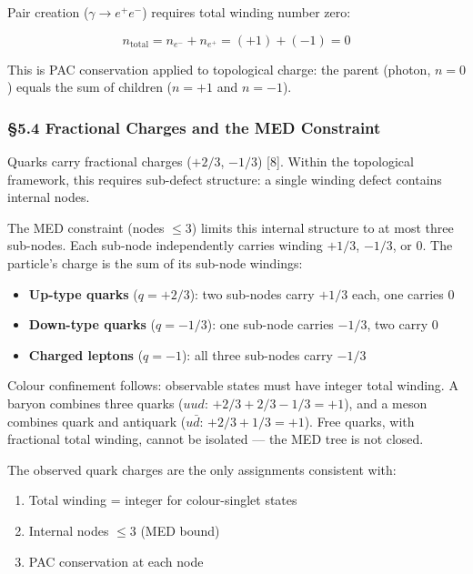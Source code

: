 \documentclass[
  11pt,
  a4paper]{article}
\providecommand{\tightlist}{%
  \setlength{\itemsep}{0pt}\setlength{\parskip}{0pt}}
\begin{document}
Pair creation (\(\gamma \to e^+ e^-\)) requires total winding number
zero:

\[n_\text{total} = n_{e^-} + n_{e^+} = (+1) + (-1) = 0\]

This is PAC conservation applied to topological charge: the parent
(photon, \(n = 0\)) equals the sum of children (\(n = +1\) and
\(n = -1\)).

\subsubsection{§5.4 Fractional Charges and the MED
Constraint}\label{fractional-charges-and-the-med-constraint}

Quarks carry fractional charges (\(+2/3\), \(-1/3\)) {[}8{]}. Within the
topological framework, this requires sub-defect structure: a single
winding defect contains internal nodes.

The MED constraint (nodes \(\leq 3\)) limits this internal structure to
at most three sub-nodes. Each sub-node independently carries winding
\(+1/3\), \(-1/3\), or \(0\). The particle's charge is the sum of its
sub-node windings:

\begin{itemize}
\tightlist
\item
  \textbf{Up-type quarks} (\(q = +2/3\)): two sub-nodes carry \(+1/3\)
  each, one carries \(0\)
\item
  \textbf{Down-type quarks} (\(q = -1/3\)): one sub-node carries
  \(-1/3\), two carry \(0\)
\item
  \textbf{Charged leptons} (\(q = -1\)): all three sub-nodes carry
  \(-1/3\)
\end{itemize}

Colour confinement follows: observable states must have integer total
winding. A baryon combines three quarks (\(uud\):
\(+2/3 + 2/3 - 1/3 = +1\)), and a meson combines quark and antiquark
(\(u\bar{d}\): \(+2/3 + 1/3 = +1\)). Free quarks, with fractional total
winding, cannot be isolated --- the MED tree is not closed.

The observed quark charges are the only assignments consistent with:

\begin{enumerate}
\def\labelenumi{\arabic{enumi}.}
\tightlist
\item
  Total winding = integer for colour-singlet states
\item
  Internal nodes \(\leq 3\) (MED bound)
\item
  PAC conservation at each node
\end{enumerate}
\end{document}
